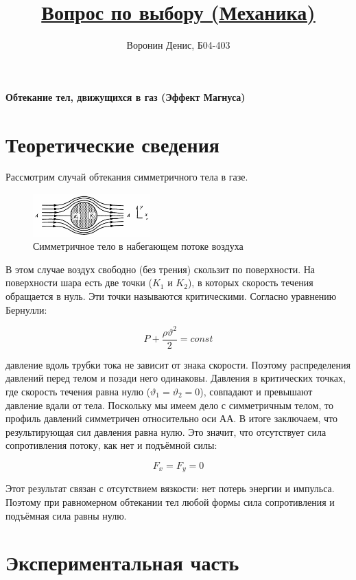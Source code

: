 \documentclass[a4paper]{article}
\title{\underline{Вопрос по выбору (Механика)}}
\author{Воронин Денис, Б04-403}
\date{}
\begin{document}
\maketitle
\begin{center}
\textbf{Обтекание тел, движущихся в газ (Эффект Магнуса)}
\end{center}

\section{Теоретические сведения}

Рассмотрим случай обтекания симметричного тела в газе.

\begin{figure}
    \centering
    \includegraphics[width=0.4\textwidth]{pick1.PNG}
    \caption{Симметричное 
    тело в набегающем потоке воздуха}
\end{figure}

В этом случае воздух свободно (без трения) скользит по поверхности. На поверхности шара есть две точки ($K_{1}$ и $K_{2}$), в которых скорость 
течения обращается в нуль. Эти точки называются критическими. 
Согласно уравнению Бернулли:

\[P+ \frac{\rho \vartheta^{2}}{2} = const\] 

давление вдоль трубки тока не зависит от знака скорости. Поэтому распределения давлений перед телом и позади него одинаковы. Давления в 
критических точках, где скорость течения равна нулю ($\vartheta_{1}= \vartheta_{2} = 0$), совпадают и превышают давление вдали от тела.
Поскольку мы имеем дело с симметричным телом, то профиль давлений симметричен относительно оси АА. В итоге заключаем, что результирующая сил давления равна нулю. Это значит, что отсутствует сила сопротивления потоку, как нет и подъёмной силы:

\[F_{x} = F_{y} = 0\]

Этот результат связан с отсутствием вязкости: нет потерь энергии и импульса. Поэтому при равномерном обтекании тел 
любой формы сила сопротивления и подъёмная сила равны нулю.\par

\section{Экспериментальная часть}
\end{document}
